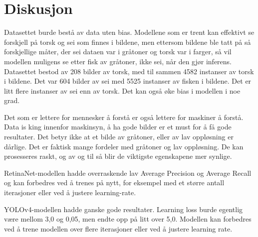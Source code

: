 




\section{Diskusjon}
\label{part:discussion}
Datasettet burde bestå av data uten bias. Modellene som er trent kan effektivt se forskjell på torsk og sei som finnes i bildene, men ettersom bildene ble tatt på så forskjellige måter, der sei dataen var i gråtoner og torsk var i farger, så vil modellen muligens se etter fisk av gråtoner, ikke sei, når den gjør inferens. Datasettet bestod av 208 bilder av torsk, med til sammen 4582 instanser av torsk i bildene. Det var 604 bilder av sei med 5525 instanser av fisken i bildene. Det er litt flere instanser av sei enn av torsk. Det kan også øke bias i modellen i noe grad.

Det som er lettere for mennesker å forstå er også lettere for maskiner å forstå. Data is king innenfor maskinsyn, å ha gode bilder er et must for å få gode resultater. Det betyr ikke at et bilde av gråtoner, eller av lav oppløsning er dårlige. Det er faktisk mange fordeler med gråtoner og lav oppløsning. De kan prosesseres raskt, og av og til så blir de viktigste egenskapene mer synlige.

RetinaNet-modellen hadde overraskende lav Average Precision og Average Recall og kan forbedres ved å trenes på nytt, for eksempel med et større antall iterasjoner eller ved å justere learning-rate. 

YOLOv4-modellen hadde ganske gode resultater. Learning loss burde egentlig være mellom 3,0 og 0,05, men endte opp på litt over 5,0. Modellen kan forbedres ved å trene modellen over flere iterasjoner eller ved å justere learning rate.

